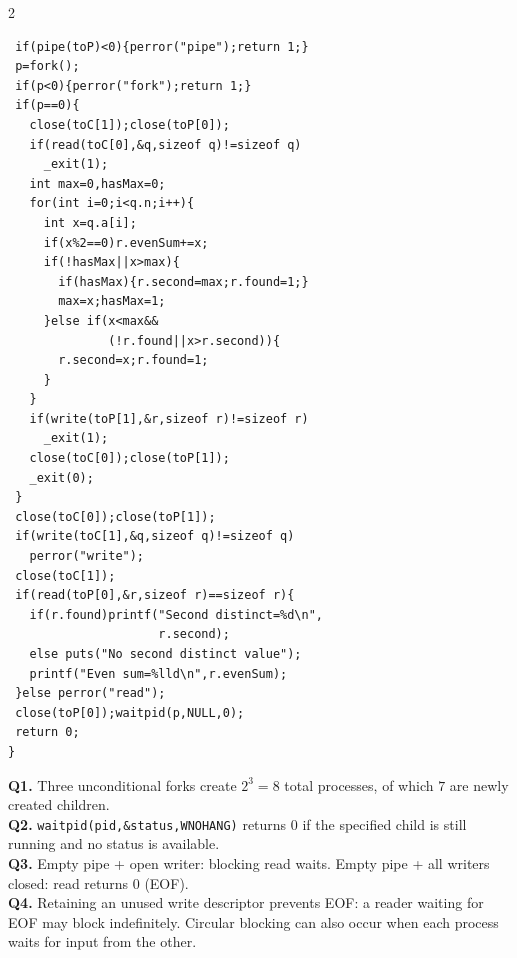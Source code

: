 \documentclass[8pt,a4paper]{extarticle}
\newcommand{\answers}{\vspace{3pt}{\bfseries Short answers (4 $\times$ 2 marks)}\par}
\begin{document}
\begin{multicols}{2}
\begin{lstlisting}
 if(pipe(toP)<0){perror("pipe");return 1;}
 p=fork();
 if(p<0){perror("fork");return 1;}
 if(p==0){
   close(toC[1]);close(toP[0]);
   if(read(toC[0],&q,sizeof q)!=sizeof q)
     _exit(1);
   int max=0,hasMax=0;
   for(int i=0;i<q.n;i++){
     int x=q.a[i];
     if(x%2==0)r.evenSum+=x;
     if(!hasMax||x>max){
       if(hasMax){r.second=max;r.found=1;}
       max=x;hasMax=1;
     }else if(x<max&&
              (!r.found||x>r.second)){
       r.second=x;r.found=1;
     }
   }
   if(write(toP[1],&r,sizeof r)!=sizeof r)
     _exit(1);
   close(toC[0]);close(toP[1]);
   _exit(0);
 }
 close(toC[0]);close(toP[1]);
 if(write(toC[1],&q,sizeof q)!=sizeof q)
   perror("write");
 close(toC[1]);
 if(read(toP[0],&r,sizeof r)==sizeof r){
   if(r.found)printf("Second distinct=%d\n",
                     r.second);
   else puts("No second distinct value");
   printf("Even sum=%lld\n",r.evenSum);
 }else perror("read");
 close(toP[0]);waitpid(p,NULL,0);
 return 0;
}
\end{lstlisting}
\answers
\textbf{Q1.} Three unconditional forks create $2^3=8$ total processes, of which $7$ are newly created children.\\
\textbf{Q2.} \texttt{waitpid(pid,\&status,WNOHANG)} returns $0$ if the specified child is still running and no status is available.\\
\textbf{Q3.} Empty pipe + open writer: blocking read waits. Empty pipe + all writers closed: read returns $0$ (EOF).\\
\textbf{Q4.} Retaining an unused write descriptor prevents EOF: a reader waiting for EOF may block indefinitely. Circular blocking can also occur when each process waits for input from the other.
\end{multicols}
\end{document}
